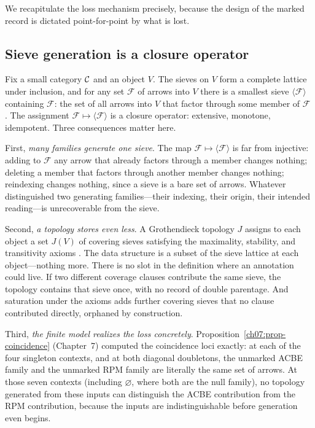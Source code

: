 We recapitulate the loss mechanism precisely, because the design of the marked record is dictated point-for-point by what is lost.

\subsection{Sieve generation is a closure operator}

Fix a small category $\mathcal{C}$ and an object $V$. The sieves on $V$ form a complete lattice under inclusion, and for any set $\mathcal{F}$ of arrows into $V$ there is a smallest sieve $\langle\mathcal{F}\rangle$ containing $\mathcal{F}$: the set of all arrows into $V$ that factor through some member of $\mathcal{F}$ \cite{maclane, johnstone}. The assignment $\mathcal{F}\mapsto\langle\mathcal{F}\rangle$ is a closure operator: extensive, monotone, idempotent. Three consequences matter here.

First, \emph{many families generate one sieve}. The map $\mathcal{F}\mapsto\langle\mathcal{F}\rangle$ is far from injective: adding to $\mathcal{F}$ any arrow that already factors through a member changes nothing; deleting a member that factors through another member changes nothing; reindexing changes nothing, since a sieve is a bare set of arrows. Whatever distinguished two generating families---their indexing, their origin, their intended reading---is unrecoverable from the sieve.

Second, \emph{a topology stores even less}. A Grothendieck topology $J$ assigns to each object a set $J(V)$ of covering sieves satisfying the maximality, stability, and transitivity axioms \cite{stacks00Z4}. The data structure is a subset of the sieve lattice at each object---nothing more. There is no slot in the definition where an annotation could live. If two different coverage clauses contribute the same sieve, the topology contains that sieve once, with no record of double parentage. And saturation under the axioms adds further covering sieves that no clause contributed directly, orphaned by construction.

Third, \emph{the finite model realizes the loss concretely}. Proposition~\ref{ch07:prop-coincidence} (Chapter~7) computed the coincidence loci exactly: at each of the four singleton contexts, and at both diagonal doubletons, the unmarked ACBE family and the unmarked RPM family are literally the same set of arrows. At those seven contexts (including $\varnothing$, where both are the null family), no topology generated from these inputs can distinguish the ACBE contribution from the RPM contribution, because the inputs are indistinguishable before generation even begins.

